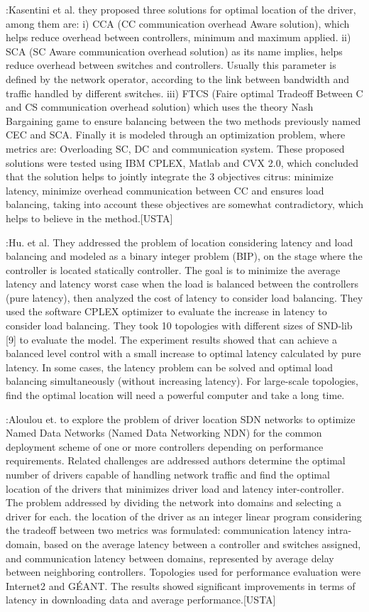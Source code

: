 \documentclass[a4paper,10pt]{article}
\begin{document}
\cite{KsBa16}:Kasentini et al. they proposed three solutions for optimal location of the driver, among them are: i) CCA (CC communication overhead Aware solution), which helps reduce overhead between controllers, minimum and maximum applied. ii) SCA (SC Aware communication overhead solution) as its name implies, helps reduce overhead between switches and controllers. Usually this parameter is defined by the network operator, according to the link between bandwidth and traffic handled by different switches. iii) FTCS (Faire optimal Tradeoff Between C and CS communication overhead solution) which uses the theory Nash Bargaining game to ensure balancing between the two methods previously named CEC and SCA. Finally it is modeled through an optimization problem, where metrics are: Overloading SC, DC and communication system. These proposed solutions were tested using IBM CPLEX, Matlab and CVX 2.0, which concluded that the solution helps to jointly integrate the 3 objectives citrus: minimize latency, minimize overhead communication between CC and ensures load balancing, taking into account these objectives are somewhat contradictory, which helps to believe in the method.[USTA]


\cite{HuLu16}:Hu. et al. They addressed the problem of location considering latency and load balancing and modeled as a binary integer problem (BIP), on the stage where the controller is located statically controller. The goal is to minimize the average latency and latency worst case when the load is balanced between the controllers (pure latency), then analyzed the cost of latency to consider load balancing. They used the software CPLEX optimizer to evaluate the increase in latency to consider load balancing. They took 10 topologies with different sizes of SND-lib [9] to evaluate the model. The experiment results showed that can achieve a balanced level control with a small increase to optimal latency calculated by pure latency. In some cases, the latency problem can be solved and optimal load balancing simultaneously (without increasing latency). For large-scale topologies, find the optimal location will need a powerful computer and take a long time.


\cite{AlAy17}:Aloulou et. to explore the problem of driver location SDN networks to optimize Named Data Networks (Named Data Networking NDN) for the common deployment scheme of one or more controllers depending on performance requirements. Related challenges are addressed authors determine the optimal number of drivers capable of handling network traffic and find the optimal location of the drivers that minimizes driver load and latency inter-controller.
The problem addressed by dividing the network into domains and selecting a driver for each. the location of the driver as an integer linear program considering the tradeoff between two metrics was formulated: communication latency intra-domain, based on the average latency between a controller and switches assigned, and communication latency between domains, represented by average delay between neighboring controllers. Topologies used for performance evaluation were Internet2 and GÉANT. The results showed significant improvements in terms of latency in downloading data and average performance.[USTA]
\end{document}
